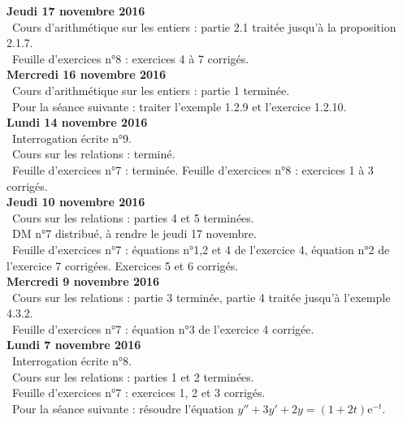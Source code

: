 \documentclass[12pt,a4paper]{article}
\begin{document}
\noindent\textbf{Jeudi 17 novembre 2016}\\
\bu\ Cours d'arithmétique sur les entiers : partie 2.1 traitée jusqu'à la proposition 2.1.7. \\
\bu\ Feuille d'exercices n°8 : exercices 4 à 7 corrigés.\vspace{.4cm}\\

\noindent\textbf{Mercredi 16 novembre 2016}\\
\bu\ Cours d'arithmétique sur les entiers : partie 1 terminée. \\
\bu\ Pour la séance suivante : traiter l'exemple 1.2.9 et l'exercice 1.2.10.\vspace{.4cm}\\

\noindent\textbf{Lundi 14 novembre 2016}\\
\bu\ Interrogation écrite n°9.\\
\bu\ Cours sur les relations : terminé. \\
\bu\ Feuille d'exercices n°7 : terminée. Feuille d'exercices n°8 : exercices 1 à 3 corrigés.\vspace{.4cm}\\

\noindent\textbf{Jeudi 10 novembre 2016}\\
\bu\ Cours sur les relations : parties 4 et 5 terminées. \\
\bu\ DM n°7 distribué, à rendre le jeudi 17 novembre. \\
\bu\ Feuille d'exercices n°7 : équations n°1,2 et 4 de l'exercice 4, équation n°2 de l'exercice 7 corrigées. Exercices 5 et 6 corrigés.\vspace{.4cm}\\

\noindent\textbf{Mercredi 9 novembre 2016}\\
\bu\ Cours sur les relations : partie 3 terminée, partie 4 traitée jusqu'à l'exemple 4.3.2. \\
\bu\ Feuille d'exercices n°7 : équation n°3 de l'exercice 4 corrigée.\vspace{.4cm}\\

\noindent\textbf{Lundi 7 novembre 2016}\\
\bu\ Interrogation écrite n°8.\\
\bu\ Cours sur les relations : parties 1 et 2 terminées. \\
\bu\ Feuille d'exercices n°7 : exercices 1, 2 et 3 corrigés.\\
\bu\ Pour la séance suivante : résoudre l'équation $y''+3y'+2y=(1+2t)\mathrm{e}^{-t}$.\vspace{.4cm}\\
\end{document}
